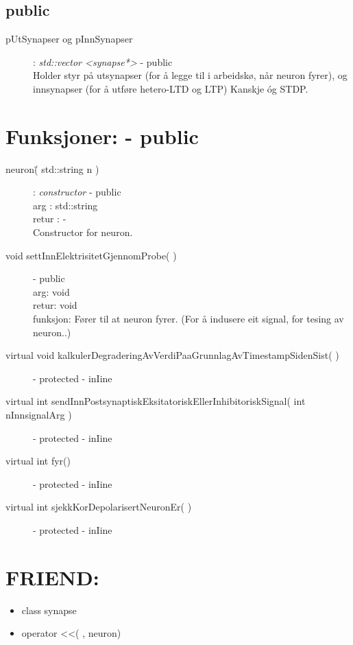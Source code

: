 \documentclass[norsk,11 pt]{report}
\begin{document}
		\subsection{public}
			\begin{description}
				\item[pUtSynapser og pInnSynapser] : \textit{std::vector <synapse*>} \indent - public \\
				Holder styr på utsynapser (for å legge til i arbeidskø, når neuron fyrer), og innsynapser (for å utføre hetero-LTD og LTP) 
				Kanskje \'{o}g STDP.
	\end{description}

	\section{Funksjoner:  -  	public}
		
		\begin{description}
			\item[neuron\=( std::string n )]   : \textit{constructor} 	- public \\
				arg : 	std::string \\
				retur : 	- \\
				
				Constructor for neuron.
				
			\item[void settInnElektrisitetGjennomProbe( )] 	 		- public 	\\
				arg: 	void 							\\
				retur: 	void 						\\
				funksjon: 	Fører til at neuron fyrer. (For å indusere eit signal, for tesing av neuron..) \\
		
		
			\item[virtual void kalkulerDegraderingAvVerdiPaaGrunnlagAvTimestampSidenSist( )] 			- protected - inIine
			\item[virtual int sendInnPostsynaptiskEksitatoriskEllerInhibitoriskSignal( int nInnsignalArg )] - protected - inIine
			\item[virtual int fyr()] 												- protected - inIine
			\item[virtual int sjekkKorDepolarisertNeuronEr( )] 								- protected - inIine
 		\end{description}
	\section{FRIEND:}
		\begin{itemize}
			\item	class synapse
			\item operator <<( , neuron)
		\end{itemize}
\end{document}
